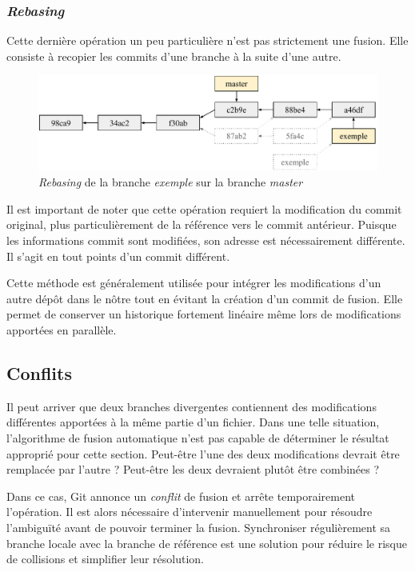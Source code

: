 \documentclass[11pt,a4paper]{article}
\begin{document}
\subsubsection{\textit{Rebasing}}

Cette dernière opération un peu particulière n'est pas strictement une fusion. Elle consiste à recopier les commits d'une branche à la suite d'une autre.

\begin{figure}[ht]
\begin{center}
\includegraphics[width=13cm]{img_rebase}
\caption{\textit{Rebasing} de la branche \textit{exemple} sur la branche \textit{master}}
\end{center}
\end{figure}

Il est important de noter que cette opération requiert la modification du commit original, plus particulièrement de la référence vers le commit antérieur.
Puisque les informations commit sont modifiées, son adresse est nécessairement différente. Il s'agit en tout points d'un commit différent.

Cette méthode est généralement utilisée pour intégrer les modifications d'un autre dépôt dans le nôtre tout en évitant la création d'un commit de fusion.
Elle permet de conserver un historique fortement linéaire même lors de modifications apportées en parallèle.

\subsection{Conflits}

Il peut arriver que deux branches divergentes contiennent des modifications différentes apportées à la même partie d'un fichier. Dans une telle situation, l'algorithme de fusion automatique n'est pas capable de déterminer le résultat approprié pour cette section.
Peut-être l'une des deux modifications devrait être remplacée par l'autre ?
Peut-être les deux devraient plutôt être combinées ?

Dans ce cas, Git annonce un \textit{conflit} de fusion et arrête temporairement l'opération.
Il est alors nécessaire d'intervenir manuellement pour résoudre l'ambiguïté avant de pouvoir terminer la fusion.
Synchroniser régulièrement sa branche locale avec la branche de référence est une solution pour réduire le risque de collisions et simplifier leur résolution.
\end{document}
